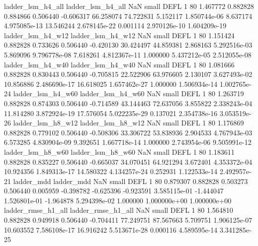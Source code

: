        ladder_lsm_h4_all        ladder_lsm_h4_all                   NaN      small     DEFL                 1 80 1.467772       0.882828 0.884866       0.506440   -0.606317     66.258074     74.722831     5.152117   1.850744e-06  8.637174 4.975085e-13    13.546244   2.678145e-22            0.001114    2.970126e-10        1.604209e-19
       ladder_lsm_h4_w12        ladder_lsm_h4_w12                   NaN      small     DEFL                 1 80 1.151424       0.882828 0.733626       0.506440   -0.420130     30.424497     44.859381     2.868163   5.292516e-03  5.869096 9.796778e-08     7.618261   4.812367e-11            1.000000    5.437212e-05        2.512055e-08
       ladder_lsm_h4_w40        ladder_lsm_h4_w40                   NaN      small     DEFL                 1 80 1.081666       0.882828 0.830443       0.506440   -0.705815     22.522906     63.976605     2.130107   3.627493e-02 10.856886 2.486690e-17    16.618025   1.657462e-27            1.000000    1.506934e-14        1.002765e-24
       ladder_lsm_h4_w60        ladder_lsm_h4_w60                   NaN      small     DEFL                 1 80 1.263719       0.882828 0.874303       0.506440   -0.714589     43.144463     72.637056     3.855822   2.338243e-04 11.814280 3.872924e-19    17.576054   5.022235e-29            0.137021    2.354738e-16        3.053519e-26
       ladder_lsm_h8_w12        ladder_lsm_h8_w12                   NaN      small     DEFL                 1 80 1.176869       0.882828 0.779102       0.506440   -0.508306     33.306722     53.838936     2.904533   4.767943e-03  6.573285 4.830904e-09     9.392651   1.667718e-14            1.000000    2.743954e-06        9.505991e-12
       ladder_lsm_h8_w60        ladder_lsm_h8_w60                   NaN      small     DEFL                 1 80 1.183611       0.882828 0.835227       0.506440   -0.665037     34.070451     64.921294     3.672401   4.353372e-04 10.924356 1.849313e-17    14.580322   4.134257e-24            0.252931    1.122533e-14        2.492957e-21
              ladder_mdd               ladder_mdd                   NaN      small     DEFL                 1 80 0.879307       0.882828 0.503273       0.506440    0.005959     -0.398782     -0.625396    -0.923591   3.585115e-01 -1.444047 1.526801e-01    -1.964878   5.294398e-02            1.000000    1.000000e+00        1.000000e+00
      ladder_rmse_h1_all       ladder_rmse_h1_all                   NaN      small     DEFL                 1 80 1.564810       0.882828 0.949918       0.506440   -0.704411     77.249751     87.567663     5.709751   1.906125e-07 10.603552 7.586108e-17    16.916242   5.513671e-28            0.000116    4.589595e-14        3.341285e-25
